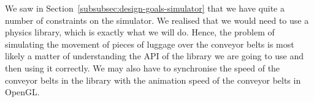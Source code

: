 We saw in Section~\ref{subsubsec:design-goals-simulator} that we have quite a number of constraints on the simulator. We realised that we would need to use a physics library, which is exactly what we will do. Hence, the problem of simulating the movement of pieces of luggage over the conveyor belts is most likely a matter of understanding the API of the library we are going to use and then using it correctly. We may also have to synchronise the speed of the conveyor belts in the library with the animation speed of the conveyor belts in OpenGL.